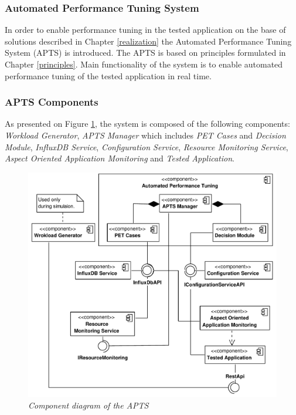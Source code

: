 \documentclass[12pt,a4paper]{article}
\begin{document}
\subsubsection{Automated Performance Tuning System}

In order to enable performance tuning in the tested application on the base of solutions described in Chapter \ref{realization} the Automated Performance Tuning System (APTS) is introduced. The APTS is based on principles formulated in Chapter \ref{principles}. Main functionality of the system is to enable automated  performance tuning of the tested application in real time. 

\subsubsection{APTS Components}

As presented on Figure \ref{componentapts}, the system is composed of the following components: \textit{Workload Generator}, \textit{APTS Manager} which includes \textit{PET Cases} and \textit{Decision Module}, \textit{InfluxDB Service}, \textit{Configuration Service}, \textit{Resource Monitoring Service}, \textit{Aspect Oriented Application Monitoring} and \textit{Tested Application}.

\begin{figure}[!htb]
\centering
\includegraphics[width=1\textwidth]{APTSComponentDiagram}
\caption{\textit{Component diagram of the APTS}}
\label{componentapts}
\end{figure}
\end{document}

